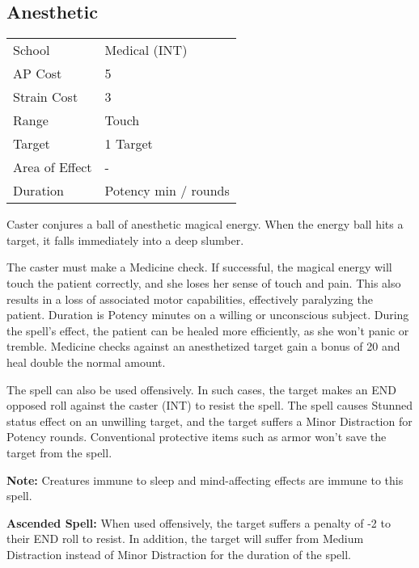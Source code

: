 \documentclass[11pt,a4paper,twocolumn]{book}
\begin{document}
\subsection*{Anesthetic}
{
	\begin{tabu} to 75mm{| X[l,4] | X[l,7] |}
		\hline
		School 			& Medical (INT) 	\\
		AP Cost	      	& 5 				\\
		Strain Cost     & 3 				\\
		Range     		& Touch 			\\
		Target      	& 1 Target 			\\
		Area of Effect  & - 	 			\\
		Duration     	& Potency min / rounds 	\\ \hline
	\end{tabu}
	
}

\medskip

Caster conjures a ball of anesthetic magical energy. When the energy ball hits a target, it falls immediately into a deep slumber.

The caster must make a Medicine check. If successful, the magical energy will touch the patient correctly, and she loses her sense of touch and pain. This also results in a loss of associated motor capabilities, effectively paralyzing the patient. Duration is Potency minutes on a willing or unconscious subject. During the spell's effect, the patient can be healed more efficiently, as she won't panic or tremble. Medicine checks against an anesthetized target gain a bonus of 20 and heal double the normal amount.

The spell can also be used offensively. In such cases, the target makes an END opposed roll against the caster (INT) to resist the spell. The spell causes Stunned status effect on an unwilling target, and the target suffers a Minor Distraction for Potency rounds. Conventional protective items such as armor won't save the target from the spell.

\textbf{Note:} Creatures immune to sleep and mind-affecting effects are immune to this spell.

\bigskip

\textbf{Ascended Spell:} When used offensively, the target suffers a penalty of -2 to their END roll to resist. In addition, the target will suffer from Medium Distraction instead of Minor Distraction for the duration of the spell.
\end{document}
